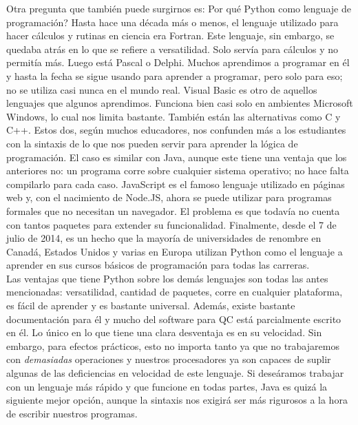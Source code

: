 \documentclass[10pt,letterpaper]{article}
\begin{document}
Otra pregunta que tambi\'en puede surgirnos es: Por qu\'e Python como lenguaje de programaci\'on? Hasta hace una d\'ecada m\'as o menos, el lenguaje utilizado para hacer c\'alculos y rutinas en ciencia era Fortran. Este lenguaje, sin embargo, se quedaba atr\'as en lo que se refiere a versatilidad. Solo serv\'ia para c\'alculos y no permit\'ia m\'as. Luego est\'a Pascal o Delphi. Muchos aprendimos a programar en \'el y hasta la fecha se sigue usando para aprender a programar, pero solo para eso; no se utiliza casi nunca en el mundo real. Visual Basic es otro de aquellos lenguajes que algunos aprendimos. Funciona bien casi solo en ambientes Microsoft Windows, lo cual nos limita bastante. Tambi\'en est\'an las alternativas como C y C++. Estos dos, seg\'un muchos educadores, nos confunden m\'as a los estudiantes con la sintaxis de lo que nos pueden servir para aprender la l\'ogica de programaci\'on. El caso es similar con Java, aunque este tiene una ventaja que los anteriores no: un programa corre sobre cualquier sistema operativo; no hace falta compilarlo para cada caso. JavaScript es el famoso lenguaje utilizado en p\'aginas web y, con el nacimiento de Node.JS, ahora se puede utilizar para programas formales que no necesitan un navegador. El problema es que todav\'ia no cuenta con tantos paquetes para extender su funcionalidad. Finalmente, desde el 7 de julio de 2014, es un hecho que la mayor\'ia de universidades de renombre en Canad\'a, Estados Unidos y varias en Europa utilizan Python como el lenguaje a aprender en sus cursos b\'asicos de programaci\'on para todas las carreras.\\

Las ventajas que tiene Python sobre los dem\'as lenguajes son todas las antes mencionadas: versatilidad, cantidad de paquetes, corre en cualquier plataforma, es f\'acil de aprender y es bastante universal. Adem\'as, existe bastante documentaci\'on para \'el y mucho del software para QC est\'a parcialmente escrito en \'el. Lo \'unico en lo que tiene una clara desventaja es en su velocidad. Sin embargo, para efectos pr\'acticos, esto no importa tanto ya que no trabajaremos con \emph{demasiadas} operaciones y nuestros procesadores ya son capaces de suplir algunas de las deficiencias en velocidad de este lenguaje. Si dese\'aramos trabajar con un lenguaje m\'as r\'apido y que funcione en todas partes, Java es quiz\'a la siguiente mejor opci\'on, aunque la sintaxis nos exigir\'a ser m\'as rigurosos a la hora de escribir nuestros programas.\\
\end{document}
